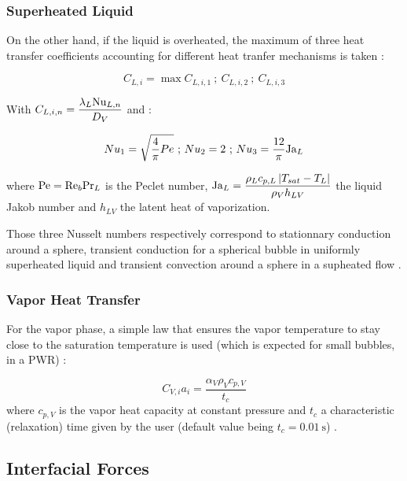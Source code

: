 \subsubsection{Superheated Liquid}

On the other hand, if the liquid is overheated, the maximum of three heat transfer coefficients accounting for different heat tranfer mechanisms is taken \cite{berne_analyse_1983}:

\begin{equation}
C_{L,i}=\max{C_{L,i,1}\ ;\ C_{L,i,2}\ ;\ C_{L,i,3}}
\label{eq:ncfd_supheat_L}
\end{equation}

With $C_{L,i,n}=\dfrac{\lambda_{L}\mathrm{Nu}_{L,n}}{D_{V}}$ and :

\begin{equation}
\label{eq:nusselt}
Nu_{1}=\sqrt{\frac{4}{\pi}Pe}\text { ; } Nu_{2}=2 \text{ ; } Nu_{3}=\frac{12}{\pi} \mathrm{Ja}_{L}
\end{equation}


where $\mathrm{Pe}=\mathrm{Re}_{b} \mathrm{Pr}_{L}$ is the Peclet number, $\mathrm{Ja}_{L}=\dfrac{ \rho_{L}c_{p,L}\left| T_{sat}-T_{L} \right|}{\rho_{V} h_{LV}} $ the liquid Jakob number and $h_{LV}$ the latent heat of vaporization. 

\npar

Those three Nusselt numbers respectively correspond to stationnary conduction around a sphere, transient conduction for a spherical bubble in uniformly superheated liquid \cite{plesset_growth_1954} and transient convection around a sphere in a supheated flow \cite{ruckenstein_mass_1964}.

\subsubsection{Vapor Heat Transfer}

For the vapor phase, a simple law that ensures the vapor temperature to stay close to the saturation temperature is used (which is expected for small bubbles, \eg in a PWR) :

\begin{equation}
C_{V,i}a_{i}=\frac{\alpha_{V}\rho_{V}c_{p,V}}{t_{c}}
\label{eq:ncfd_vap_relaxation}
\end{equation}
where $c_{p,V}$ is the vapor heat capacity at constant pressure and $t_{c}$ a characteristic (relaxation) time given by the user (default value being $t_{c}=0.01\ \text{s}$) .

\subsection{Interfacial Forces}
\label{subsec:ncfd_interf_qdm}

